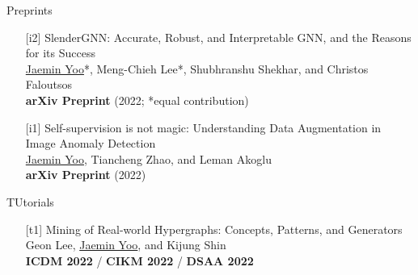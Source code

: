 \documentclass{resume} %
\begin{document}
\begin{rSection}{Preprints}
\smallskip
\begin{enumerate}[leftmargin=*]

	\item[{[i2]}]
		SlenderGNN: Accurate, Robust, and Interpretable GNN, and the Reasons for its Success \\
		\underline{Jaemin Yoo}*, Meng-Chieh Lee*, Shubhranshu Shekhar, and Christos Faloutsos \\
		\textbf{arXiv Preprint} (2022; *equal contribution) \\

	\item[{[i1]}]
		Self-supervision is not magic: Understanding Data Augmentation in Image Anomaly Detection \\
		\underline{Jaemin Yoo}, Tiancheng Zhao, and Leman Akoglu \\
		\textbf{arXiv Preprint} (2022) \\

\end{enumerate}
\end{rSection}


\begin{rSection}{TUtorials}
\smallskip
\begin{enumerate}[leftmargin=*]

	\item[{[t1]}]
		Mining of Real-world Hypergraphs: Concepts, Patterns, and Generators \\
		Geon Lee, \underline{Jaemin Yoo}, and Kijung Shin \\
		\textbf{ICDM 2022} / \textbf{CIKM 2022} / \textbf{DSAA 2022} \\

\end{enumerate}
\end{rSection}

\end{document}
